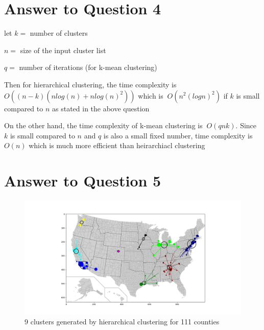 \documentclass[a4paper]{article}
\begin{document}
\section*{Answer to Question 4}

let $k =$ number of clusters

$n = $ size of the input cluster list

$q = $ number of iterations (for k-mean clustering)

Then for hierarchical clustering, the time complexity is $O((n - k)(nlog(n) + n{log(n)}^2))$
which is $~ O(n^2(logn)^2)$ if $k$ is small compared to $n$ as stated in the above question

On the other hand, the time complexity of k-mean clustering is $~ O(qnk)$. Since $k$ is small
compared to $n$ and $q$ is also a small fixed number, time complexity is $O(n)$ which is much more
efficient than heirarchiacl clustering 


\section*{Answer to Question 5}
\FloatBarrier
\begin{figure}[h]
	\centering 
	\includegraphics[scale = 0.5, clip=True, trim=5.5cm 1.5cm 0cm 2.5cm]{Q5_hierarchical.png}
		\caption{9 clusters generated by hierarchical clustering for 111 counties}
\end{figure}
\FloatBarrier
\end{document}
